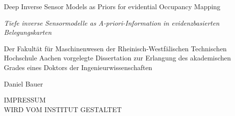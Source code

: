 
\begin{titlepage}
  \centering
  \begin{minipage}[t]{9.8cm}
      \begin{center}
          {\large Deep Inverse Sensor Models as Priors for evidential Occupancy Mapping}
          \bigskip
      \end{center}
  \end{minipage}
  \begin{minipage}[t]{9.8cm}
      \begin{center}
          {\large \textcolor{ikagrey}{\textit{Tiefe inverse Sensormodelle as A-priori-Information in evidenzbasierten Belegungskarten}}}
          \bigskip
      \end{center}
  \end{minipage}
  \vfill
  \begin{minipage}[t]{16.5cm}
      \begin{center}
          Der Fakultät für Maschinenwesen der Rheinisch-Westfälischen Technischen Hochschule Aachen vorgelegte Dissertation zur Erlangung des akademischen Grades eines Doktors der Ingenieurwissenschaften
      \end{center}
  \end{minipage}
  \vfill
  \begin{minipage}[t]{9.8cm}
      \begin{center}
          Daniel Bauer
      \end{center}
  \end{minipage}
  \vfill
\end{titlepage}
\newpage
\pagestyle{empty}
\vspace{10cm}
\begin{center}
  IMPRESSUM\\
  \bigskip
  WIRD VOM INSTITUT GESTALTET
\end{center}
\vfill
\restoregeometry
